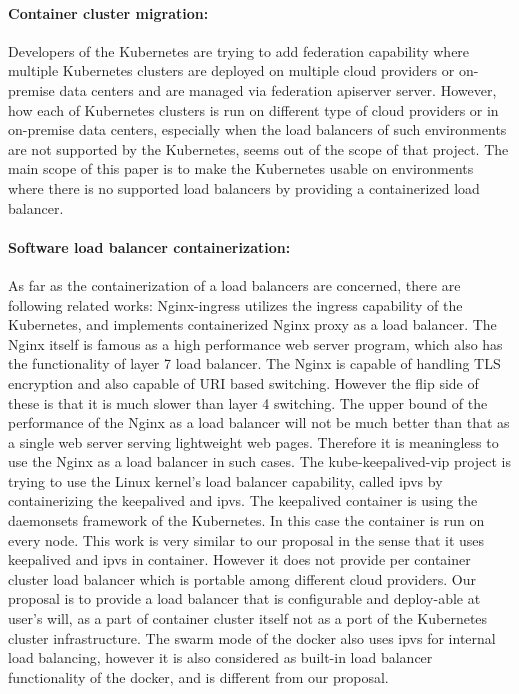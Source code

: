\paragraph{\bf Container cluster migration:}
Developers of the Kubernetes are trying to add federation\cite{K8sFederation2017} capability 
where multiple Kubernetes clusters are deployed on multiple cloud providers or on-premise data centers 
and are managed via federation apiserver server. However, how each of Kubernetes clusters is run on different type of cloud providers
or in on-premise data centers, especially when the load balancers of such environments are not supported by the Kubernetes, 
seems out of the scope of that project. 
The main scope of this paper is to make the Kubernetes usable on environments where there is no supported load balancers
by providing a containerized load balancer.

\paragraph{\bf Software load balancer containerization:}
As far as the containerization of a load balancers are concerned, there are following related works:
Nginx-ingress\cite{Pleshakov2016,NginxInc2016} utilizes the ingress\cite{K8sIngress2017} capability of the Kubernetes, 
and implements containerized Nginx proxy as a load balancer. The Nginx itself is famous as a high performance web server program,
which also has the functionality of layer 7 load balancer. The Nginx is capable of handling TLS encryption and also capable of  
URI based switching. However the flip side of these is that it is much slower than layer 4 switching.
The upper bound of the performance of the Nginx as a load balancer will not be much better than 
that as a single web server serving lightweight web pages. 
Therefore it is meaningless to use the Nginx as a load balancer in such cases.
The kube-keepalived-vip\cite{Prashanth2016} project is trying to use the Linux kernel's load balancer capability, 
called ipvs\cite{Zhang2000} by containerizing the keepalived\cite{ACassen2016} and ipvs. 
The keepalived container is using the daemonsets\cite{K8sDaemonsets2017} framework of the Kubernetes. 
In this case the container is run on every node.
This work is very similar to our proposal in the sense that it uses keepalived and ipvs in container. 
However it does not provide per container cluster load balancer which is portable among different cloud providers.   
Our proposal is to provide a load balancer that is configurable and deploy-able at user's will,
 as a part of container cluster itself not as a port of the Kubernetes cluster infrastructure.  
The swarm mode of the docker\cite{DockerCoreEngineering2016,DockerInc2017} also uses ipvs for internal load balancing,
however it is also considered as built-in load balancer functionality of the docker, 
and is different from our proposal.

